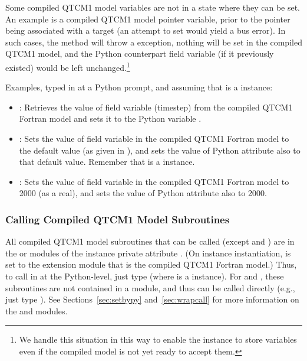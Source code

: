 Some compiled QTCM1 model variables are not in a state where they
can be set.  An example is a compiled QTCM1 model pointer variable,
prior to the pointer being associated with a target (an attempt
to set would yield a bus error).  In such cases, the
 method will throw a
 exception, nothing will
be set in the compiled QTCM1 model, and the Python counterpart
field variable (if it previously existed) would be left unchanged.\footnote%
	{We handle this situation in this way to enable the
	 instance to store variables
	even if the compiled model is not yet ready to accept them.}

Examples, typed in at a Python prompt, and
assuming that  is a  instance:
\begin{itemize}
\item {}:
	Retrieves the value of field variable  (timestep)
	from the compiled QTCM1 Fortran model and sets it to the
	Python variable .

\item {}:
	Sets the value of field variable 
	in the compiled QTCM1 Fortran model to the default
	value (as given in ),
	and sets the value of Python attribute  also to 
	that default value.  
	Remember that  is a 
	instance.

\item {}:
	Sets the value of field variable 
	in the compiled QTCM1 Fortran model to 2000 (as a real),
	and sets the value of Python attribute  also to 2000.
\end{itemize}


		\subsubsection{Calling Compiled QTCM1 Model Subroutines}

All compiled QTCM1 model subroutines that can be called
(except  and ) are in the
 or  modules
of the  instance private attribute .
(On  instance instantiation,  is set
to the  extension module that is the compiled QTCM1 Fortran model.)
Thus, to call  in  at the Python-level,
just type  (where 
is a  instance).
For  and , these subroutines are not
contained in a  module, and thus can be called
directly (e.g., just type ).
See Sections~\ref{sec:setbypy} and~\ref{sec:wrapcall} for more information
on the  and  modules.

